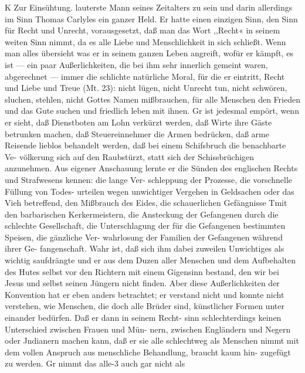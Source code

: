 K Zur Einsühtung.
lauterste Mann seines Zeitalters zu sein und darin allerdings im
Sinn Thomas Carlyles ein ganzer Held. Er hatte einen
einzigen Sinn, den Sinn für Recht und Unrecht, vorausgesetzt,
daß man das Wort ,,Recht« in seinem weiten Sinn nimmt,
da es alle Liebe und Menschlichkeit in sich schließt. Wenn man
alles übersieht was er in seinem ganzen Leben angreift, wofür
er kämpft, es ist — ein paar Außerlichkeiten, die bei ihm sehr
innerlich gemeint waren, abgerechnet — immer die schlichte
natürliche Moral, für die er eintritt, Recht und Liebe und Treue
(Mt. 23): nicht lügen, nicht Unrecht tun, nicht schwören, sluchen,
stehlen, nicht Gottes Namen mißbrauchen, für alle Menschen den
Frieden und das Gute suchen und friedlich leben mit ihnen. Gr
ist jedesmal empört, wenn er sieht, daß Dienstboten am Lohn
verkürzt werden, daß Wirte ihre Gäste betrunken machen, daß
Steuereinnehmer die Armen bedrücken, daß arme Reisende lieblos
behandelt werden, daß bei einem Schifsbruch die benachbarte Ve-
völkerung sich auf den Raubstürzt, statt sich der Schissbrüchigen
anzunehmen. Aus eigener Anschauung lernte er die Sünden des
englischen Rechts und Strafwesens kennen: die lange Ver-
schleppung der Prozesse, die vorschnelle Füllung von Todes-
urteilen wegen unwichtiger Vergehen in Geldsachen oder das
Vieh betreffend, den Mißbrauch des Eides, die schauerlichen
Gefängnisse Tmit den barbarischen Kerkermeistern, die Ansteckung
der Gefangenen durch die schlechte Gesellschaft, die Unterschlagung
der für die Gefangenen bestimmten Speisen, die gänzliche Ver-
wahrlosung der Familien der Gefangenen während ihrer Ge-
fangenschaft. Wahr ist, daß sich ihm dabei zuweilen Unwichtiges
als wichtig saufdrängte und er aus dem Duzen aller Menschen
und dem Aufbehalten des Hutes selbst vor den Richtern mit
einem Gigensinn bestand, den wir bei Jesus und selbst seinen
Jüngern nicht finden. Aber diese Außerlichkeiten der Konvention
hat er eben anders betrachtet; er verstand nicht und konnte nicht
verstehen, wie Menschen, die doch alle Brüder sind, künstlicher
Formen unter einander bedürfen. Daß er dann in seinem Recht-
sinn schlechterdings keinen Unterschied zwischen Frauen und Mün-
nern, zwischen Engländern und Negern oder Jndianern machen
kann, daß er sie alle schlechtweg als Menschen nimmt mit dem
vollen Anspruch aus menschliche Behandlung, braucht kaum hin-
zugefügt zu werden. Gr nimmt das alle-3 auch gar nicht als


